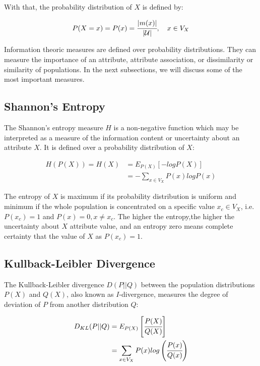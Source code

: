 With that, the probability distribution of $X$ is defined by:

\begin{equation}
 P(X=x)=P(x)=\cfrac{|m(x)|}{|\mathcal{U}|},\quad x \in V_X
\end{equation}

Information theoric measures are defined over probability distributions. They can measure the importance of an
attribute, attribute association, or dissimilarity or similarity of populations. In the next subsections, we will
discuss some of the most important measures.

\subsection{Shannon's Entropy}

The Shannon's entropy measure $H$ is a non-negative function which may be interpreted as a measure of the information
content or uncertainty about an attribute $X$. It is defined over a probability distribution of $X$:

\begin{equation}
\begin{split}
 H(P(X))=H(X)&=E_{P(X)}[-logP(X)] \\
 &=-\sum_{x \in V_X}P(x)logP(x)
\end{split} 
\end{equation}

The entropy of $X$ is maximum if its probability distribution is uniform and minimum if the whole population is
concentrated on a specific value $x_c \in V_X$, i.e. $P(x_c)=1$ and $P(x)=0, x \neq x_c$. The higher the entropy,the
higher the uncertainty about $X$ attribute value, and an entropy zero means complete certainty that the value of $X$ as
$P(x_c)=1$.

\subsection{Kullback-Leibler Divergence}

The Kullback-Leibler divergence $D(P||Q)$ between the population distributions $P(X)$ and $Q(X)$, also known as
$I$-divergence, measures the degree of deviation of $P$ from another distribution $Q$:

\begin{equation}
\begin{split}
 D_{KL}(P||Q)&=E_{P(X)}\left[\cfrac{P(X)}{Q(X)}\right] \\
 &=\sum_{x \in V_X}P(x)log\left(\cfrac{P(x)}{Q(x)}\right)
\end{split} 
\end{equation}

